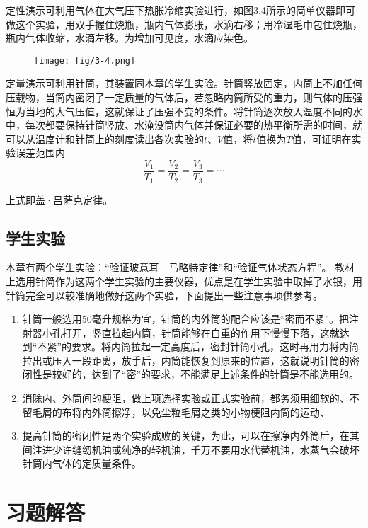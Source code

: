 定性演示可利用气体在大气压下热胀冷缩实验进行，如图3.4所示的简单仪器即可做这个实验，用双手握住烧瓶，瓶内气体膨胀，水滴右移；用冷湿毛巾包住烧瓶，瓶内气体收缩，水滴左移。为增加可见度，水滴应染色。
\begin{figure}[htp]
    \centering
\texttt{[image: fig/3-4.png]}
    \caption{}
\end{figure}

定量演示可利用针筒，其装置同本章的学生实验。针筒竖放固定，内筒上不加任何压载物，当筒内密闭了一定质量的气体后，若忽略内筒所受的重力，则气体的压强恒为当地的大气压值，这就保证了压强不变的条件。将针筒逐次放入温度不同的水中，每次都要保持针筒竖放、水淹没筒内气体并保证必要的热平衡所需的时间，就可以从温度计和针筒上的刻度读出各次实验的$t$、$V$值，将$t$值换为$T$值，可证明在实验误差范围内
\[\frac{V_1}{T_1}=\frac{V_2}{T_2}=\frac{V_3}{T_3}=\cdots\]

上式即盖·吕萨克定律。

\subsection{学生实验}
本章有两个学生实验：“验证玻意耳－马略特定律”和“验证气体状态方程”。 教材上选用针简作为这两个学生实验的主要仪器，优点是在学生实验中取掉了水银，用针筒完全可以较准确地做好这两个实验，下面提出一些注意事项供参考。

\begin{enumerate}
    \item 针筒一般选用50毫升规格为宜，针筒的内外筒的配合应该是“密而不紧”。把注射器小孔打开，竖直拉起内筒，针筒能够在自重的作用下慢慢下落，这就达到“不紧”的要求。将内筒拉起一定高度后，密封针筒小孔，这时再用力将内筒拉出或压入一段距离，放手后，内筒能恢复到原来的位置，这就说明针筒的密闭性是较好的，达到了“密”的要求，不能满足上述条件的针筒是不能选用的。
\item 消除内、外筒间的梗阻，做上项选择实验或正式实验前，都务须用细软的、不留毛屑的布将内外筒擦净，以免尘粒毛屑之类的小物梗阻内筒的运动、
\item 提高针筒的密闭性是两个实验成败的关键，为此，可以在擦净内外筒后，在其间注进少许缝纫机油或纯净的轻机油，千万不要用水代替机油，水蒸气会破坏针筒内气体的定质量条件。
\end{enumerate}

\section{习题解答}

